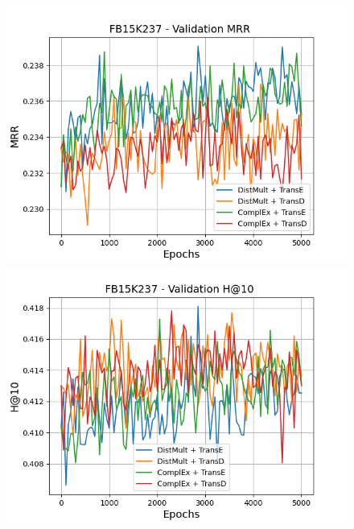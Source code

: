 \begin{figure}
    \centering
    \begin{minipage}{.5\textwidth}
      \centering
      \includegraphics[width=\linewidth]{figures/results/gan_train/pretrained/uncertainty/max_distribution/entropy/fb15k237/5k_epochs/uncertainty_fb15k237_mrrs.png}
    \end{minipage}%
    \begin{minipage}{.5\textwidth}
      \centering
      \includegraphics[width=\linewidth]{figures/results/gan_train/pretrained/uncertainty/max_distribution/entropy/fb15k237/5k_epochs/uncertainty_fb15k237_hit10.png}
    \end{minipage}
    

\end{figure}
